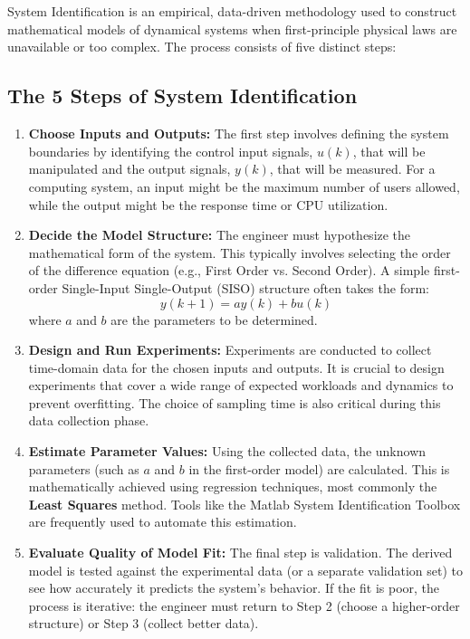 \documentclass[a4paper,12pt]{article}
\begin{document}
\section{}

System Identification is an empirical, data-driven methodology used to construct mathematical models of dynamical systems when first-principle physical laws are unavailable or too complex. The process consists of five distinct steps:

\subsection{The 5 Steps of System Identification}
\begin{enumerate}
    \item \textbf{Choose Inputs and Outputs:} 
     The first step involves defining the system boundaries by identifying the control input signals, $u(k)$, that will be manipulated and the output signals, $y(k)$, that will be measured. For a computing system, an input might be the maximum number of users allowed, while the output might be the response time or CPU utilization.

    \item \textbf{Decide the Model Structure:} 
     The engineer must hypothesize the mathematical form of the system. This typically involves selecting the order of the difference equation (e.g., First Order vs. Second Order). A simple first-order Single-Input Single-Output (SISO) structure often takes the form:
    $$ y(k+1) = a y(k) + b u(k) $$
    where $a$ and $b$ are the parameters to be determined.

    \item \textbf{Design and Run Experiments:} 
     Experiments are conducted to collect time-domain data for the chosen inputs and outputs. It is crucial to design experiments that cover a wide range of expected workloads and dynamics to prevent overfitting. The choice of sampling time is also critical during this data collection phase.

    \item \textbf{Estimate Parameter Values:} 
     Using the collected data, the unknown parameters (such as $a$ and $b$ in the first-order model) are calculated. This is mathematically achieved using regression techniques, most commonly the \textbf{Least Squares} method. Tools like the Matlab System Identification Toolbox are frequently used to automate this estimation.

    \item \textbf{Evaluate Quality of Model Fit:} 
     The final step is validation. The derived model is tested against the experimental data (or a separate validation set) to see how accurately it predicts the system's behavior. If the fit is poor, the process is iterative: the engineer must return to Step 2 (choose a higher-order structure) or Step 3 (collect better data).
\end{enumerate}
\end{document}
